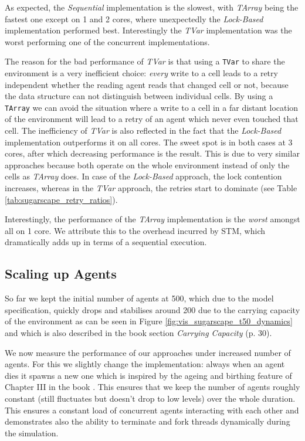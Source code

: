 As expected, the \textit{Sequential} implementation is the slowest, with \textit{TArray} being the fastest one except on 1 and 2 cores, where unexpectedly the \textit{Lock-Based} implementation performed best. Interestingly the \textit{TVar} implementation was the worst performing one of the concurrent implementations.

The reason for the bad performance of \textit{TVar} is that using a \texttt{TVar} to share the environment is a very inefficient choice: \textit{every} write to a cell leads to a retry independent whether the reading agent reads that changed cell or not, because the data structure can not distinguish between individual cells. By using a \texttt{TArray} we can avoid the situation where a write to a cell in a far distant location of the environment will lead to a retry of an agent which never even touched that cell. The inefficiency of \textit{TVar} is also reflected in the fact that the \textit{Lock-Based} implementation outperforms it on all cores. The sweet spot is in both cases at 3 cores, after which decreasing performance is the result. This is due to very similar approaches because both operate on the whole environment instead of only the cells as \textit{TArray} does. In case of the \textit{Lock-Based} approach, the lock contention increases, whereas in the \textit{TVar} approach, the retries start to dominate (see Table \ref{tab:sugarscape_retry_ratios}).

Interestingly, the performance of the \textit{TArray} implementation is the \textit{worst} amongst all on 1 core. We attribute this to the overhead incurred by STM, which dramatically adds up in terms of a sequential execution.

\subsection{Scaling up Agents}
So far we kept the initial number of agents at 500, which due to the model specification, quickly drops and stabilises around 200 due to the carrying capacity of the environment as can be seen in Figure \ref{fig:vis_sugarscape_t50_dynamics} and which is also described in the book \cite{epstein_growing_1996} section \textit{Carrying Capacity} (p. 30).

We now measure the performance of our approaches under increased number of agents. For this we slightly change the implementation: always when an agent dies it spawns a new one which is inspired by the ageing and birthing feature of Chapter III in the book \cite{epstein_growing_1996}. This ensures that we keep the number of agents roughly constant (still fluctuates but doesn't drop to low levels) over the whole duration. This ensures a constant load of concurrent agents interacting with each other and demonstrates also the ability to terminate and fork threads dynamically during the simulation.

